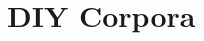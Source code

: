 \documentclass[a4paper,landscape,headrule,footrule,xetex]{foils}
\begin{document}




\section{DIY Corpora}
\end{document}
